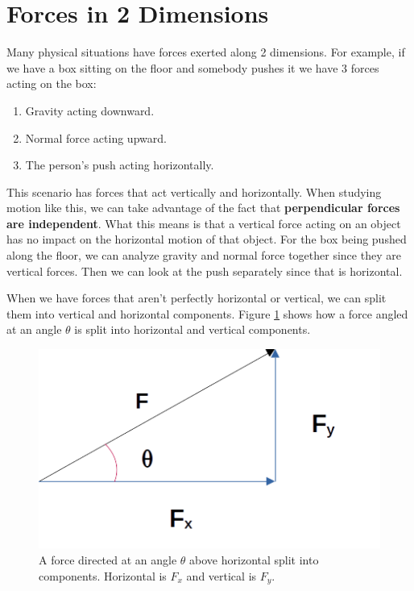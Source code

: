 \documentclass[12pt]{book}
\begin{document}
\section{Forces in 2 Dimensions}
\label{2DForces}

Many physical situations have forces exerted along 2 dimensions. For example, if we have a box sitting on the floor and somebody pushes it we have 3 forces acting on the box:

\begin{enumerate}
\item Gravity acting downward.
\item Normal force acting upward.
\item The person's push acting horizontally.
\end{enumerate}

This scenario has forces that act vertically and horizontally. When studying motion like this, we can take advantage of the fact that \textbf{perpendicular forces are independent}. What this means is that a vertical force acting on an object has no impact on the horizontal motion of that object. For the box being pushed along the floor, we can analyze gravity and normal force together since they are vertical forces. Then we can look at the push separately since that is horizontal.

When we have forces that aren't perfectly horizontal or vertical, we can split them into vertical and horizontal components. Figure \ref{ForceAngle} shows how a force angled at an angle $\theta$ is split into horizontal and vertical components.

\begin{figure}[H]
\centering
\includegraphics[scale=0.6]{Force_Angle.png}
\caption{A force directed at an angle $\theta$ above horizontal split into components. Horizontal is $F_x$ and vertical is $F_y$.}
\label{ForceAngle}
\end{figure}
\end{document}
